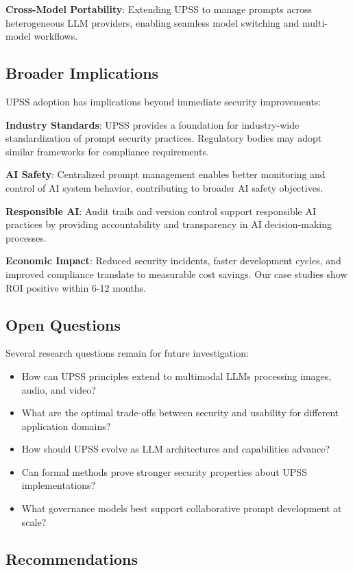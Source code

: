 \textbf{Cross-Model Portability}: Extending UPSS to manage prompts across heterogeneous LLM providers, enabling seamless model switching and multi-model workflows.

\subsection{Broader Implications}

UPSS adoption has implications beyond immediate security improvements:

\textbf{Industry Standards}: UPSS provides a foundation for industry-wide standardization of prompt security practices. Regulatory bodies may adopt similar frameworks for compliance requirements.

\textbf{AI Safety}: Centralized prompt management enables better monitoring and control of AI system behavior, contributing to broader AI safety objectives.

\textbf{Responsible AI}: Audit trails and version control support responsible AI practices by providing accountability and transparency in AI decision-making processes.

\textbf{Economic Impact}: Reduced security incidents, faster development cycles, and improved compliance translate to measurable cost savings. Our case studies show ROI positive within 6-12 months.

\subsection{Open Questions}

Several research questions remain for future investigation:

\begin{itemize}
    \item How can UPSS principles extend to multimodal LLMs processing images, audio, and video?
    \item What are the optimal trade-offs between security and usability for different application domains?
    \item How should UPSS evolve as LLM architectures and capabilities advance?
    \item Can formal methods prove stronger security properties about UPSS implementations?
    \item What governance models best support collaborative prompt development at scale?
\end{itemize}

\subsection{Recommendations}


